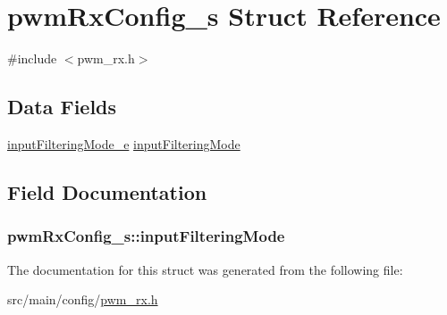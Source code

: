 \hypertarget{structpwmRxConfig__s}{\section{pwm\+Rx\+Config\+\_\+s Struct Reference}
\label{structpwmRxConfig__s}
}


{\ttfamily \#include $<$pwm\+\_\+rx.\+h$>$}

\subsection*{Data Fields}
\begin{DoxyCompactItemize}
\item 
\hyperlink{config_2pwm__rx_8h_aea6907a11ec3d80d678511f3db8fcf08}{input\+Filtering\+Mode\+\_\+e} \hyperlink{structpwmRxConfig__s_adbef602afbc305a136422e2cd53706e7}{input\+Filtering\+Mode}
\end{DoxyCompactItemize}


\subsection{Field Documentation}
\hypertarget{structpwmRxConfig__s_adbef602afbc305a136422e2cd53706e7}{
\subsubsection[{input\+Filtering\+Mode}]{ pwm\+Rx\+Config\+\_\+s\+::input\+Filtering\+Mode}}\label{structpwmRxConfig__s_adbef602afbc305a136422e2cd53706e7}


The documentation for this struct was generated from the following file\+:\begin{DoxyCompactItemize}
\item 
src/main/config/\hyperlink{config_2pwm__rx_8h}{pwm\+\_\+rx.\+h}\end{DoxyCompactItemize}
